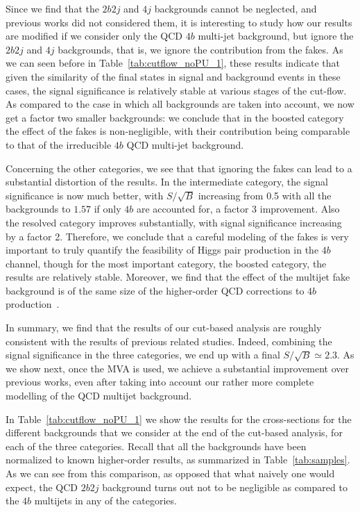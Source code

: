 Since we find that the $2b2j$ and $4j$ backgrounds cannot
be neglected, and previous works did not considered them,
it is interesting to
study how our results are modified if we consider only the QCD $4b$
multi-jet background, but ignore the $2b2j$ and $4j$ backgrounds,
that is, we ignore the contribution from the fakes.
%
As we can seen before in Table~\ref{tab:cutflow_noPU_1},
these results indicate that given the similarity of the final states
in signal and background events in these cases, the signal significance is
relatively stable at various stages of the cut-flow.
%
As compared to the case in which all backgrounds are taken into account, we
now get a factor two smaller backgrounds: we conclude that in the boosted category
the effect of the fakes is non-negligible, with their contribution being
comparable to that of the irreducible $4b$ QCD multi-jet background.

Concerning the other categories, we see that that ignoring the fakes can lead to a substantial
distortion of the results.
%
In the intermediate category, the signal significance is now much better, with $S/\sqrt{B}$ increasing from
0.5 with all the backgrounds to $1.57$ if only $4b$ are accounted for, a factor 3 improvement.
%
Also the resolved category improves substantially, with signal significance increasing by a factor 2.
%
Therefore, we conclude that a careful modeling of the fakes is very important to truly quantify
the feasibility of Higgs pair production in the $4b$ channel, though for the most
important category, the boosted category, the results are relatively stable.
%
Moreover, we find that the effect of the multijet fake background is of
the same size of the higher-order QCD corrections to $4b$ production~\cite{Binoth:2009rv}.



In summary, we find that the results of our cut-based analysis are roughly
consistent with the results of previous related studies.
%
Indeed, combining the signal significance in the three categories, we end
up with a final $S/\sqrt{B}\simeq 2.3$.
%
As we show next, once the MVA is used, we achieve a substantial
improvement
over previous works, even after taking into account our rather more
complete modelling of the QCD multijet background.



In Table~\ref{tab:cutflow_noPU_1}   we show the results for the cross-sections for the different
backgrounds that we consider at the end of the cut-based analysis, for each
of the three categories.
%
Recall that all the backgrounds have been normalized to known higher-order results,
as summarized in Table~\ref{tab:samples}.
%
As we can see from this comparison, as opposed that what naively one would expect,
the QCD $2b2j$ background turns out not to be negligible as compared to the $4b$
multijets in any of the categories.


